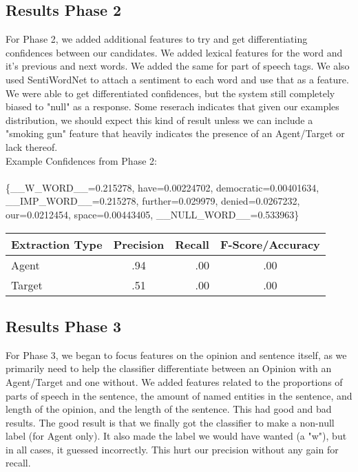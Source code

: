 \documentclass{article}
\begin{document}
          \subsection{Results Phase 2}

	For Phase 2, we added additional features to try and get differentiating confidences between our candidates. We added lexical features for the word and it's previous and next words. We added the same for part of speech tags. We also used SentiWordNet to attach a sentiment to each word and use that as a feature. We were able to get differentiated confidences, but the system still completely biased to "null" as a response. Some reserach indicates that given our examples distribution, we should expect this kind of result unless we can include a "smoking gun" feature that heavily indicates the presence of an Agent/Target or lack thereof. \\
	
\noindent Example Confidences from Phase 2: \\\\
\{\_\_W\_WORD\_\_=0.215278, have=0.00224702, democratic=0.00401634, \_\_IMP\_WORD\_\_=0.215278, further=0.029979, denied=0.0267232, our=0.0212454, space=0.00443405, \_\_NULL\_WORD\_\_=0.533963\}
	
	
\begin{center} 

        \begin{tabular}{ | l | c | r | c}
            \hline
            Extraction Type & Precision & Recall & F-Score/Accuracy \\ \hline
            Agent & .94 & .00 & .00\\ \hline
            Target & .51 & .00 & .00\\ \hline
        \end{tabular}
    \end{center}
            

            
	\subsection{Results Phase 3}

For Phase 3, we began to focus features on the opinion and sentence itself, as we primarily need to help the classifier differentiate between an Opinion with an Agent/Target and one without. We added features related to the proportions of parts of speech in the sentence, the amount of named entities in the sentence, and length of the opinion, and the length of the sentence. This had good and bad results. The good result is that we finally got the classifier to make a non-null label (for Agent only). It also made the label we would have wanted (a "w"), but in all cases, it guessed incorrectly. This hurt our precision without any gain for recall. \\ \\
\end{document}
